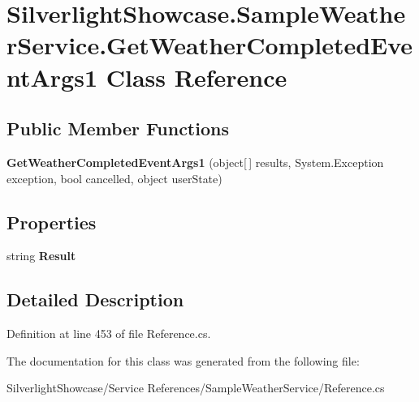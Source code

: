 \hypertarget{class_silverlight_showcase_1_1_sample_weather_service_1_1_get_weather_completed_event_args1}{
\section{SilverlightShowcase.SampleWeatherService.GetWeatherCompletedEventArgs1 Class Reference}
\label{class_silverlight_showcase_1_1_sample_weather_service_1_1_get_weather_completed_event_args1}
}
\subsection*{Public Member Functions}
\begin{DoxyCompactItemize}
\item 
\hypertarget{class_silverlight_showcase_1_1_sample_weather_service_1_1_get_weather_completed_event_args1_a272dcb405966101306e66880fd288133}{
{\bfseries GetWeatherCompletedEventArgs1} (object\mbox{[}$\,$\mbox{]} results, System.Exception exception, bool cancelled, object userState)}
\label{class_silverlight_showcase_1_1_sample_weather_service_1_1_get_weather_completed_event_args1_a272dcb405966101306e66880fd288133}

\end{DoxyCompactItemize}
\subsection*{Properties}
\begin{DoxyCompactItemize}
\item 
\hypertarget{class_silverlight_showcase_1_1_sample_weather_service_1_1_get_weather_completed_event_args1_a18a28f62b402cb5e5b009913b30ddcd2}{
string {\bfseries Result}}
\label{class_silverlight_showcase_1_1_sample_weather_service_1_1_get_weather_completed_event_args1_a18a28f62b402cb5e5b009913b30ddcd2}

\end{DoxyCompactItemize}


\subsection{Detailed Description}


Definition at line 453 of file Reference.cs.

The documentation for this class was generated from the following file:\begin{DoxyCompactItemize}
\item 
SilverlightShowcase/Service References/SampleWeatherService/Reference.cs\end{DoxyCompactItemize}
